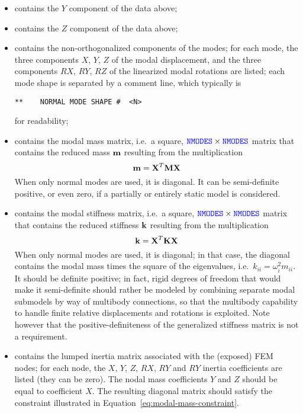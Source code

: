 \begin{itemize}
\item {} contains the $Y$ component of the data above;

\item {} contains the $Z$ component of the data above;

\item {} contains the non-orthogonalized components 
of the  modes; for each mode, the three components 
$X$, $Y$, $Z$ of the modal displacement, and the three components
$RX$, $RY$, $RZ$ of the linearized modal rotations are listed;
each mode shape is separated by a comment line, which typically is
\begin{verbatim}
**    NORMAL MODE SHAPE #  <N>
\end{verbatim}
for readability;

\item {} contains the modal mass matrix,
i.e.\ a square, $\textcolor{blue}{\texttt{NMODES}} \times \textcolor{blue}{\texttt{NMODES}}$ matrix that contains
the reduced mass
$\bm{\mathbf m}$
resulting from the multiplication
\begin{equation}
	\label{eq:modal-mass-constraint}
	\bm{\mathbf m} = \bm{\mathbf X}^T \bm{\mathbf M} \bm{\mathbf X}
\end{equation}
When only normal modes are used, it is diagonal.
It can be semi-definite positive, or even zero, if a partially 
or entirely static model is considered.

\item {} contains the modal stiffness matrix,
i.e.\ a square, $\textcolor{blue}{\texttt{NMODES}} \times \textcolor{blue}{\texttt{NMODES}}$ matrix that contains
the reduced stiffness
$\bm{\mathbf k}$
resulting from the multiplication
\begin{equation}
	\bm{\mathbf k} = \bm{\mathbf X}^T \bm{\mathbf K} \bm{\mathbf X}
\end{equation}
When only normal modes are used, it is diagonal; in that case,
the diagonal contains the modal mass times the square 
of the eigenvalues, i.e.\ $k_{ii} = \omega_i^2 m_{ii}$.
It should be definite positive; in fact, rigid degrees of freedom
that would make it semi-definite should rather be modeled by combining
separate modal submodels by way of multibody connections, so that
the multibody capability to handle finite relative displacements
and rotations is exploited.
Note however that the positive-definiteness of the generalized
stiffness matrix is not a requirement.

\item {} contains the lumped inertia matrix
associated with the  (exposed) FEM nodes;
for each node, the $X$, $Y$, $Z$, $RX$, $RY$ and $RY$ inertia
coefficients are listed (they can be zero).
The nodal mass coefficients $Y$ and $Z$ should be equal
to coefficient $X$.
The resulting diagonal matrix should satisfy the constraint
illustrated in Equation~\ref{eq:modal-mass-constraint}.


\end{itemize}
